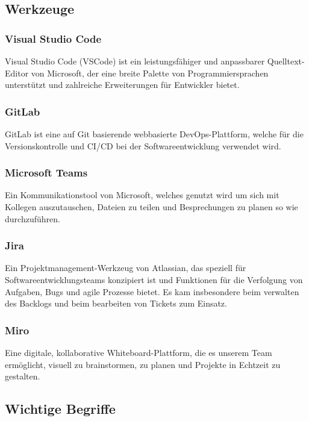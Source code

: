 \subsection{Werkzeuge}

\subsubsection{Visual Studio Code}
Visual Studio Code (VSCode) ist ein leistungsfähiger und anpassbarer Quelltext-Editor von Microsoft, der eine breite Palette von 
Programmiersprachen unterstützt und zahlreiche Erweiterungen für Entwickler bietet. 

\subsubsection{GitLab}
GitLab ist eine auf Git basierende webbasierte DevOps-Plattform, welche für die Versionskontrolle und CI/CD bei der Softwareentwicklung verwendet wird.

\subsubsection{Microsoft Teams}
Ein Kommunikationstool von Microsoft, welches genutzt wird um sich mit Kollegen auszutauschen, Dateien zu teilen und Besprechungen zu planen so wie durchzuführen.

\subsubsection{Jira}
Ein Projektmanagement-Werkzeug von Atlassian, das speziell für Softwareentwicklungsteams konzipiert ist und Funktionen für die Verfolgung von Aufgaben, Bugs und agile Prozesse bietet.
Es kam insbesondere beim verwalten des Backlogs und beim bearbeiten von Tickets zum Einsatz.

\subsubsection{Miro}
Eine digitale, kollaborative Whiteboard-Plattform, die es unserem Team ermöglicht, visuell zu brainstormen, zu planen und Projekte in Echtzeit zu gestalten.

\subsection{Wichtige Begriffe}

